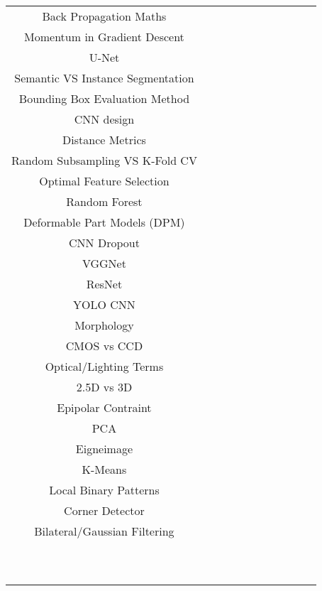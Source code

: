 \documentclass[a4paper]{article}
\begin{document}
\begin{table}[h]
\begin{tabular}{|c||c|c||c|c||c|c||c|c||c|c||}
			Back Propagation Maths & & & \checkmark & & & & & & & \\
			Momentum in Gradient Descent & & & \checkmark & & & \checkmark & & & & \\
			U-Net & & & \checkmark & & & & & & & \\
			Semantic VS Instance Segmentation & & & \checkmark & & & & & & & \\
			Bounding Box Evaluation Method & & & \checkmark & & & & & & & \\
			CNN design & & & \checkmark & & & & & & & \\
			Distance Metrics & & & & & \checkmark & & & & & \\
			Random Subsampling VS K-Fold CV & & & & & & & & & & \\
			Optimal Feature Selection & & & & & & & & & & \\
			Random Forest & & & & & & & & & & \\
			Deformable Part Models (DPM) & & & & & & & & & & \\
			CNN Dropout & & & & \checkmark & & & & & & \\
			VGGNet & & & & \checkmark & & & & & & \\
			ResNet & & & & \checkmark & & & & & & \\
			YOLO CNN & & & & \checkmark & & & & & & \\
			Morphology & & & & & \checkmark & \checkmark & \checkmark & & & \\
			CMOS vs CCD & & & & & \checkmark & & & & & \\
			Optical/Lighting Terms & & & & & \checkmark & & \checkmark & & & \\
			2.5D vs 3D& & & & & \checkmark & & & & & \\
			Epipolar Contraint & & & & & \checkmark & & & & & \\
			PCA & & & & & \checkmark & & & & & \\
			Eigneimage & & & & & \checkmark & & & & & \\
			K-Means & & & & & & \checkmark & & & & \\
			Local Binary Patterns & & & & & & \checkmark & & & & \\
			Corner Detector & & & & & & & & & & \\
			Bilateral/Gaussian Filtering & & & & & & & & & & \\
			      & & & & & & & & & & \\
			      & & & & & & & & & & \\
			      & & & & & & & & & & \\
			      & & & & & & & & & & \\
			      & & & & & & & & & & \\
			      & & & & & & & & & & \\
			      & & & & & & & & & & \\
			      & & & & & & & & & & \\
			      & & & & & & & & & & \\
			      & & & & & & & & & & \\
			\hline
			\hline
		\end{tabular}
	\end{table}
\end{document}

